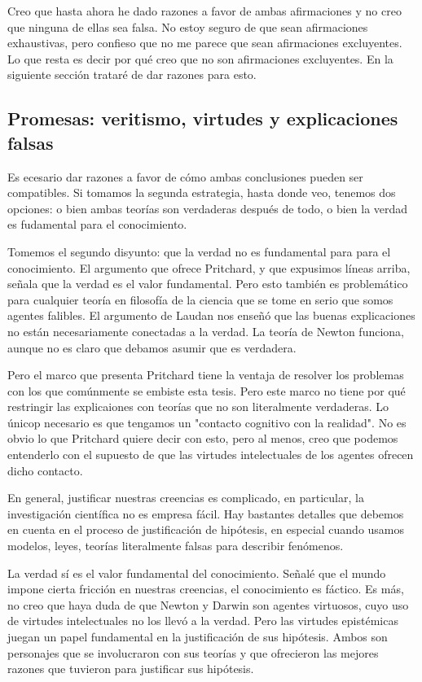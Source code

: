 Creo que hasta ahora he dado razones a favor de ambas afirmaciones y no creo que ninguna de ellas sea falsa.
No estoy seguro de que sean afirmaciones exhaustivas, pero confieso que no me parece que sean afirmaciones excluyentes.
Lo que resta es decir por qué creo que no son afirmaciones excluyentes.
En la siguiente sección trataré de dar razones para esto.

\subsection{Promesas: veritismo, virtudes y explicaciones falsas}

Es ecesario dar razones a favor de cómo ambas conclusiones pueden ser compatibles.
Si tomamos la segunda estrategia, hasta donde veo, tenemos dos opciones: o bien ambas teorías son verdaderas después de todo, o bien la verdad es fudamental para el conocimiento.

Tomemos el segundo disyunto: que la verdad no es fundamental para para el conocimiento.
El argumento que ofrece Pritchard, y que expusimos líneas arriba, señala que la verdad es el valor fundamental.
Pero esto también es problemático para cualquier teoría en filosofía de la ciencia que se tome en serio que somos agentes falibles. 
El argumento de Laudan \parencite{laudan1981} nos enseñó que las buenas explicaciones no están necesariamente conectadas a la verdad.
La teoría de Newton funciona, aunque no es claro que debamos asumir que es verdadera.

Pero el marco que presenta Pritchard tiene la ventaja de resolver los problemas con los que comúnmente se embiste esta tesis.
Pero este marco no tiene por qué restringir las explicaiones con teorías que no son literalmente verdaderas.
Lo únicop necesario es que tengamos un "contacto cognitivo con la realidad".
No es obvio lo que Pritchard quiere decir con esto, pero al menos, creo que podemos entenderlo con el supuesto de que las virtudes intelectuales de los agentes ofrecen dicho contacto.

En general, justificar nuestras creencias es complicado, en particular, la investigación científica no es empresa fácil.
Hay bastantes detalles que debemos en cuenta en el proceso de justificación de hipótesis, en especial cuando usamos modelos, leyes, teorías literalmente falsas para describir fenómenos. 

La verdad sí es el valor fundamental del conocimiento. 
Señalé que el mundo impone cierta fricción en nuestras creencias, el conocimiento es fáctico. 
Es más, no creo que haya duda de que Newton y Darwin son agentes virtuosos, cuyo uso de virtudes intelectuales no los llevó a la verdad.
Pero las virtudes epistémicas juegan un papel fundamental en la justificación de sus hipótesis.
Ambos son personajes que se involucraron con sus teorías y que ofrecieron las mejores razones que tuvieron para justificar sus hipótesis.

